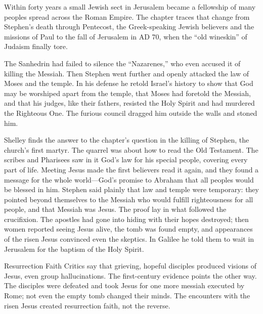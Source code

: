 
\begin{inbrief}
Within forty years a small Jewish sect in Jerusalem became a fellowship of many peoples spread across
the Roman Empire. The chapter traces that change from Stephen's death through Pentecost, the Greek-speaking
Jewish believers and the missions of Paul to the fall of Jerusalem in AD 70, when the ``old wineskin''
of Judaism finally tore.
\end{inbrief}

The Sanhedrin had failed to silence the ``Nazarenes,'' who even accused it of killing the Messiah. Then
Stephen went further and openly attacked the law of Moses and the temple. In his defense he retold
Israel's history to show that God may be worshiped apart from the temple, that Moses had foretold the
Messiah, and that his judges, like their fathers, resisted the Holy Spirit and had murdered the
Righteous One. The furious council dragged him outside the walls and stoned him.

Shelley finds the answer to the chapter's question in the killing of Stephen, the church's first martyr. The quarrel was about how to read the Old Testament. The scribes and Pharisees saw in it
God's law for his special people, covering every part of life. Meeting Jesus made the first believers
read it again, and they found a message for the whole world---God's promise to Abraham that all
peoples would be blessed in him. Stephen said plainly that law and temple were temporary: they pointed
beyond themselves to the Messiah who would fulfill righteousness for all people, and that Messiah was
Jesus. The proof lay in what followed the crucifixion. The apostles had gone into hiding with their
hopes destroyed; then women reported seeing Jesus alive, the tomb was found empty, and appearances of
the risen Jesus convinced even the skeptics. In Galilee he told them to wait in Jerusalem for the
baptism of the Holy Spirit.

\begin{sidebox}{Resurrection Faith}
Critics say that grieving, hopeful disciples produced visions of Jesus, even group hallucinations. The
first-century evidence points the other way. The disciples were defeated and took Jesus for one more
messiah executed by Rome; not even the empty tomb changed their minds. The encounters with the risen
Jesus created resurrection faith, not the reverse.
\end{sidebox}

